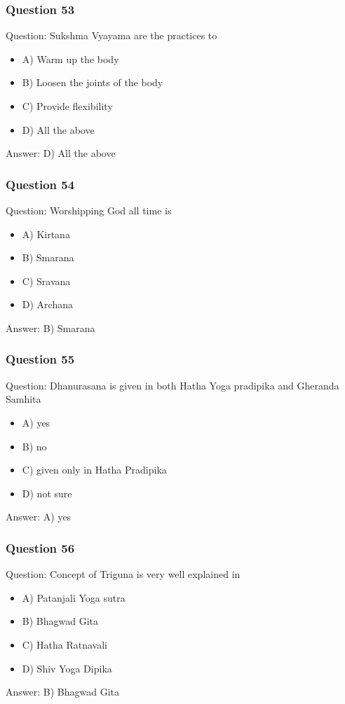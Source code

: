 \begin{frame}[fragile]\frametitle{Question 53}
Question: Sukshma Vyayama are the practices to
\begin{itemize}
\item A) Warm up the body
\item B) Loosen the joints of the body
\item C) Provide flexibility
\item D) All the above
\end{itemize}
Answer: D) All the above
\end{frame}

\begin{frame}[fragile]\frametitle{Question 54}
Question: Worshipping God all time is
\begin{itemize}
\item A) Kirtana
\item B) Smarana
\item C) Sravana
\item D) Archana
\end{itemize}
Answer: B) Smarana
\end{frame}

\begin{frame}[fragile]\frametitle{Question 55}
Question: Dhanurasana is given in both Hatha Yoga pradipika and Gheranda Samhita
\begin{itemize}
\item A) yes
\item B) no
\item C) given only in Hatha Pradipika
\item D) not sure
\end{itemize}
Answer: A) yes
\end{frame}

\begin{frame}[fragile]\frametitle{Question 56}
Question: Concept of Triguna is very well explained in
\begin{itemize}
\item A) Patanjali Yoga sutra
\item B) Bhagwad Gita
\item C) Hatha Ratnavali
\item D) Shiv Yoga Dipika
\end{itemize}
Answer: B) Bhagwad Gita
\end{frame}

